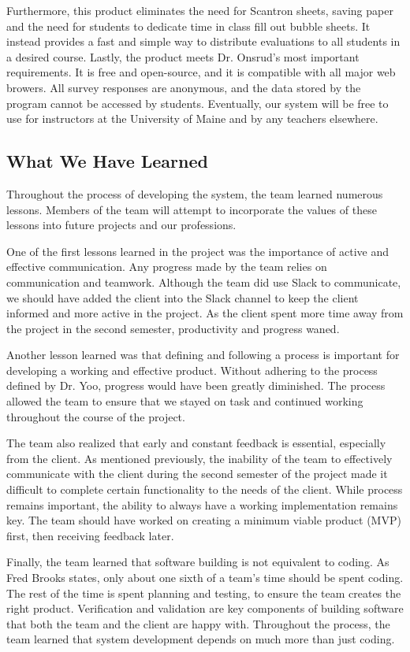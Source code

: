 \documentclass{article}
\begin{document}
Furthermore, this product eliminates the need for Scantron sheets, saving paper and the need for students to dedicate time in class fill out bubble sheets. It instead provides a fast and simple way to distribute evaluations to all students in a desired course. Lastly, the product meets Dr. Onsrud's most important requirements. It is free and open-source, and it is compatible with all major web browers. All survey responses are anonymous, and the data stored by the program cannot be accessed by students. Eventually, our system will be free to use for instructors at the University of Maine and by any teachers elsewhere.

\subsection{What We Have Learned}

Throughout the process of developing the system, the team learned numerous lessons. Members of the team will attempt to incorporate the values of these lessons into future projects and our professions. 

One of the first lessons learned in the project was the importance of active and effective communication. Any progress made by the team relies on communication and teamwork. Although the team did use Slack to communicate, we should have added the client into the Slack channel to keep the client informed and more active in the project. As the client spent more time away from the project in the second semester, productivity and progress waned.

Another lesson learned was that defining and following a process is important for developing a working and effective product. Without adhering to the process defined by Dr. Yoo, progress would have been greatly diminished. The process allowed the team to ensure that we stayed on task and continued working throughout the course of the project. 

The team also realized that early and constant feedback is essential, especially from the client. As mentioned previously, the inability of the team to effectively communicate with the client during the second semester of the project made it difficult to complete certain functionality to the needs of the client. While process remains important, the ability to always have a working implementation remains key. The team should have worked on creating a minimum viable product (MVP) first, then receiving feedback later. 

Finally, the team learned that software building is not equivalent to coding. As Fred Brooks states, only about one sixth of a team's time should be spent coding. The rest of the time is spent planning and testing, to ensure the team creates the right product. Verification and validation are key components of building software that both the team and the client are happy with. Throughout the process, the team learned that system development depends on much more than just coding. 
\end{document}

